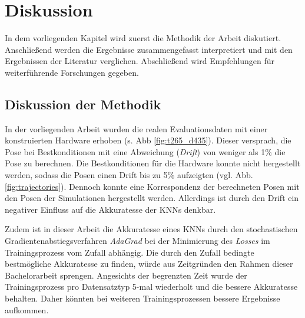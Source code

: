 
\section{Diskussion}
\label{sec:kapitel_5}
In dem vorliegenden Kapitel wird zuerst die Methodik der Arbeit diskutiert. Anschließend werden die Ergebnisse zusammengefasst interpretiert und mit den Ergebnissen der Literatur verglichen. Abschließend wird Empfehlungen für weiterführende Forschungen gegeben. 


\subsection{Diskussion der Methodik}
\label{subsec:disc_methode}

In der vorliegenden Arbeit wurden die realen Evaluationsdaten mit einer konstruierten Hardware erhoben (s. Abb \ref{fig:t265_d435}). Dieser versprach, die Pose bei Bestkonditionen mit eine Abweichung (\textit{Drift}) von weniger als 1\% die Pose zu berechnen. Die Bestkonditionen für die Hardware konnte nicht hergestellt werden, sodass die Posen einen Drift bis zu 5\% aufzeigten (vgl. Abb. \ref{fig:trajectories}). Dennoch konnte eine Korrespondenz der berechneten Posen mit den Posen der Simulationen hergestellt werden. Allerdings ist durch den Drift ein negativer Einfluss auf die Akkuratesse der KNNs denkbar.


Zudem ist in dieser Arbeit die Akkuratesse eines KNNs durch den stochastischen Gradientenabstiegsverfahren \textit{AdaGrad} bei der Minimierung des \textit{Losses} im Trainingsprozess vom Zufall abhängig. Die durch den Zufall bedingte bestmögliche Akkuratesse zu finden, würde aus Zeitgründen den Rahmen dieser Bachelorarbeit sprengen. Angesichts der begrenzten Zeit wurde der Trainingsprozess pro Datensatztyp 5-mal wiederholt und die bessere Akkuratesse behalten. Daher könnten bei weiteren Trainingsprozessen bessere Ergebnisse aufkommen.

